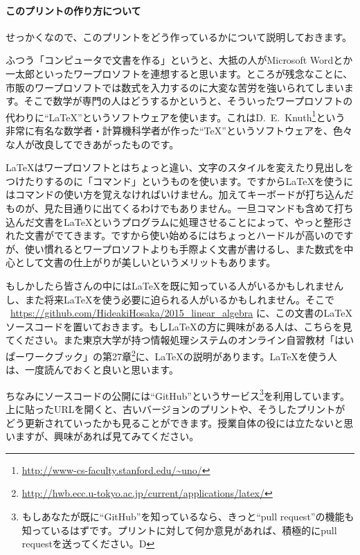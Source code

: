 \paragraph{このプリントの作り方について}

せっかくなので、このプリントをどう作っているかについて説明しておきます。

ふつう「コンピュータで文書を作る」というと、大抵の人がMicrosoft Wordとか一太郎といったワープロソフトを連想すると思います。ところが残念なことに、市販のワープロソフトでは数式を入力するのに大変な苦労を強いられてしまいます。そこで数学が専門の人はどうするかというと、そういったワープロソフトの代わりに``\LaTeX''というソフトウェアを使います。これはD.~E.~Knuth\footnote{\url{http://www-cs-faculty.stanford.edu/~uno/}}という非常に有名な数学者・計算機科学者が作った``\TeX''というソフトウェアを、色々な人が改良してできあがったものです。

\LaTeX はワープロソフトとはちょっと違い、文字のスタイルを変えたり見出しをつけたりするのに「コマンド」というものを使います。ですから\LaTeX を使うにはコマンドの使い方を覚えなければいけません。加えてキーボードが打ち込んだものが、見た目通りに出てくるわけでもありません。一旦コマンドも含めて打ち込んだ文書を\LaTeX というプログラムに処理させることによって、やっと整形された文書がでてきます。ですから使い始めるにはちょっとハードルが高いのですが、使い慣れるとワープロソフトよりも手際よく文書が書けるし、また数式を中心として文書の仕上がりが美しいというメリットもあります。

もしかしたら皆さんの中には\LaTeX を既に知っている人がいるかもしれませんし、また将来\LaTeX を使う必要に迫られる人がいるかもしれません。そこで
\ \url{https://github.com/HideakiHosaka/2015_linear_algebra}
に、この文書の\LaTeX ソースコードを置いておきます。もし\LaTeX の方に興味がある人は、こちらを見てください。また東京大学が持つ情報処理システムのオンライン自習教材「はいぱーワークブック」の第27章\footnote{\url{http://hwb.ecc.u-tokyo.ac.jp/current/applications/latex/}}に、\LaTeX の説明があります。\LaTeX を使う人は、一度読んでおくと良いと思います。

ちなみにソースコードの公開には``GitHub''というサービス\footnote{もしあなたが既に``GitHub''を知っているなら、きっと``pull request''の機能も知っているはずです。プリントに対して何か意見があれば、積極的にpull requestを送ってください。\textsf{\raisebox{1pt}{:}D}}を利用しています。上に貼ったURLを開くと、古いバージョンのプリントや、そうしたプリントがどう更新されていったかも見ることができます。授業自体の役には立たないと思いますが、興味があれば見てみてください。

